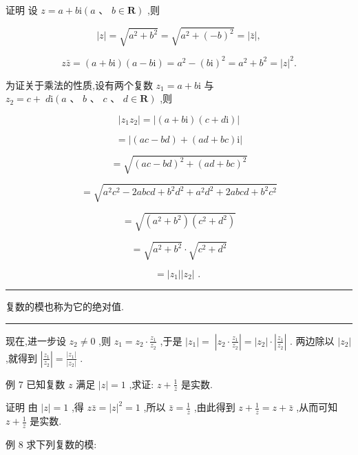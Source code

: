 \documentclass[10pt]{article}
\newcommand{\HRule}{\begin{center}\rule{0.9\linewidth}{0.2mm}\end{center}}
\begin{document}
证明 设 \(z = a + b\mathrm{i}\left( {a\text{ 、 }b \in  \mathbf{R}}\right)\) ,则

\[
\left| z\right|  = \sqrt{{a}^{2} + {b}^{2}} = \sqrt{{a}^{2} + {\left( -b\right) }^{2}} = \left| \bar{z}\right| ,
\]

\[
z\bar{z} = \left( {a + b\mathrm{i}}\right) \left( {a - b\mathrm{i}}\right)  = {a}^{2} - {\left( b\mathrm{i}\right) }^{2} = {a}^{2} + {b}^{2} = {\left| z\right| }^{2}.
\]

为证关于乘法的性质,设有两个复数 \({z}_{1} = a + b\mathrm{i}\) 与 \({z}_{2} = c + \; d\mathrm{i}\left( {a\text{ 、 }b\text{ 、 }c\text{ 、 }d \in  \mathbf{R}}\right)\) ,则

\[
\left| {{z}_{1}{z}_{2}}\right|  = \left| {\left( {a + b\mathrm{i}}\right) \left( {c + d\mathrm{i}}\right) }\right|
\]

\[
= \left| {\left( {{ac} - {bd}}\right)  + \left( {{ad} + {bc}}\right) \mathrm{i}}\right|
\]

\[
= \sqrt{{\left( ac - bd\right) }^{2} + {\left( ad + bc\right) }^{2}}
\]

\[
= \sqrt{{a}^{2}{c}^{2} - {2abcd} + {b}^{2}{d}^{2} + {a}^{2}{d}^{2} + {2abcd} + {b}^{2}{c}^{2}}
\]

\[
= \sqrt{\left( {{a}^{2} + {b}^{2}}\right) \left( {{c}^{2} + {d}^{2}}\right) }
\]

\[
= \sqrt{{a}^{2} + {b}^{2}} \cdot  \sqrt{{c}^{2} + {d}^{2}}
\]

\[
= \left| {z}_{1}\right| \left| {z}_{2}\right| \text{ . }
\]

\HRule

复数的模也称为它的绝对值.

\HRule

现在,进一步设 \({z}_{2} \neq  0\) ,则 \({z}_{1} = {z}_{2} \cdot  \frac{{z}_{1}}{{z}_{2}}\) ,于是 \(\left| {z}_{1}\right|  = \; \left| {{z}_{2} \cdot  \frac{{z}_{1}}{{z}_{2}}}\right|  = \left| {z}_{2}\right|  \cdot  \left| \frac{{z}_{1}}{{z}_{2}}\right|\) . 两边除以 \(\left| {z}_{2}\right|\) ,就得到 \(\left| \frac{{z}_{1}}{{z}_{2}}\right|  = \frac{\left| {z}_{1}\right| }{\left| {z}_{2}\right| }\) .

例 7 已知复数 \(z\) 满足 \(\left| z\right|  = 1\) ,求证: \(z + \frac{1}{z}\) 是实数.

证明 由 \(\left| z\right|  = 1\) ,得 \(z\bar{z} = {\left| z\right| }^{2} = 1\) ,所以 \(\bar{z} = \frac{1}{z}\) ,由此得到 \(z + \frac{1}{z} = z + \bar{z}\) ,从而可知 \(z + \frac{1}{z}\) 是实数.

例 8 求下列复数的模:
\end{document}
